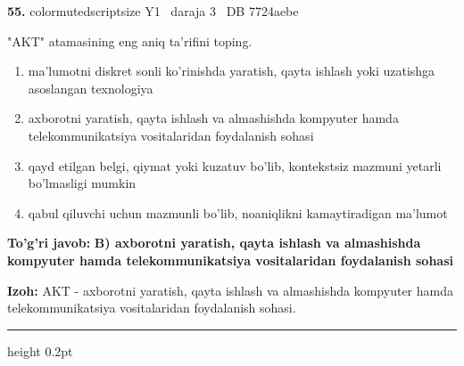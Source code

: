 \documentclass[10pt,a4paper,oneside]{article}
\begin{document}
\noindent\textbf{\color{ink}55.}  {color{muted}scriptsize Y1 \textbullet\ daraja 3 \textbullet\ DB 7724aebe}
\par
"AKT" atamasining eng aniq ta'rifini toping.
\begin{enumerate}[label=\Alph*),leftmargin=9mm]
\item ma'lumotni diskret sonli ko'rinishda yaratish, qayta ishlash yoki uzatishga asoslangan texnologiya
\item axborotni yaratish, qayta ishlash va almashishda kompyuter hamda telekommunikatsiya vositalaridan foydalanish sohasi
\item qayd etilgan belgi, qiymat yoki kuzatuv bo'lib, kontekstsiz mazmuni yetarli bo'lmasligi mumkin
\item qabul qiluvchi uchun mazmunli bo'lib, noaniqlikni kamaytiradigan ma'lumot
\end{enumerate}
\begin{tcolorbox}[enhanced,breakable,colback=teal!4,colframe=teal!50!black,boxrule=0.5pt,arc=1.1mm,left=3mm,right=3mm,top=1.7mm,bottom=1.7mm,before skip=2mm,after skip=2mm]
\textbf{\color{teal}To'g'ri javob:} \textbf{B) axborotni yaratish, qayta ishlash va almashishda kompyuter hamda telekommunikatsiya vositalaridan foydalanish sohasi}
\par\smallskip
\textbf{Izoh:} AKT - axborotni yaratish, qayta ishlash va almashishda kompyuter hamda telekommunikatsiya vositalaridan foydalanish sohasi.
\end{tcolorbox}
\vspace{2mm}\hrule height 0.2pt \vspace{3mm}
\end{document}
